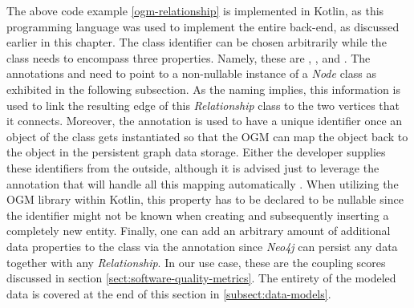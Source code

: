 \documentclass[12pt,a4paper]{report}
\begin{document}
The above code example \ref{ogm-relationship} is implemented in Kotlin, as this
programming language was used to implement the entire back-end, as discussed
earlier in this chapter. The class identifier can be chosen arbitrarily while
the class needs to encompass three properties. Namely, these are , , and . The annotations 
and  need to point to a non-nullable instance of a \textit{Node}
class as exhibited in the following subsection. As the naming implies, this
information is used to link the resulting edge of this \textit{Relationship}
class to the two vertices that it connects. Moreover, the  annotation
is used to have a unique identifier once an object of the class gets
instantiated so that the OGM can map the object back to the object in the
persistent graph data storage. Either the developer supplies these identifiers
from the outside, although it is advised just to leverage the  annotation that will handle all this mapping automatically
\cite{neo4j-ogm}. When utilizing the OGM library within Kotlin, this property
has to be declared to be nullable since the identifier might not be known when
creating and subsequently inserting a completely new entity. Finally, one can
add an arbitrary amount of additional data properties to the class via the
 annotation since \textit{Neo4j} can persist any data together
with any \textit{Relationship}. In our use case, these are the coupling scores
discussed in section \ref{sect:software-quality-metrics}. The entirety of the
modeled data is covered at the end of this section in \ref{subsect:data-models}.
\end{document}
